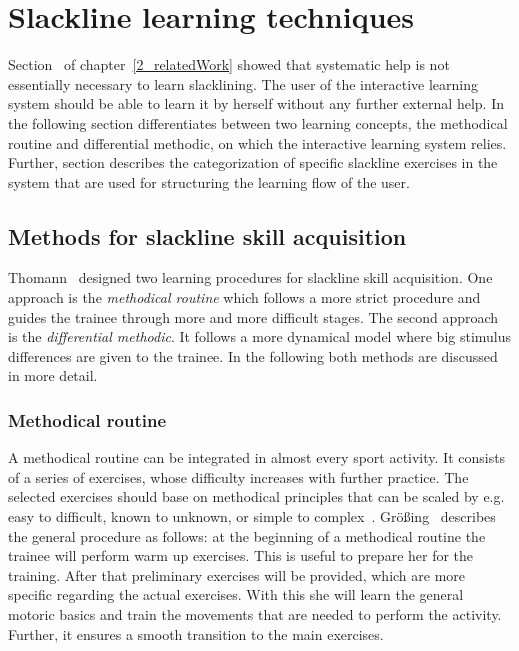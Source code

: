 \section{Slackline learning techniques}\label{3_3_learningTechniques}
Section~\textit{} of chapter~\ref{2_relatedWork} showed that systematic help is not essentially necessary to learn slacklining. The user of the interactive learning system should be able to learn it by herself without any further external help. In the following section \textit{} differentiates between two learning concepts, the methodical routine and differential methodic, on which the interactive learning system relies.
Further, section \textit{} describes the categorization of specific slackline exercises in the system that are used for structuring the learning flow of the user.

\subsection{Methods for slackline skill acquisition}\label{3_3_1_learningConcepts}
Thomann~\cite{Thomann2013-aa} designed two learning procedures for slackline skill acquisition. One approach is the \textit{methodical routine} which follows a more strict procedure and guides the trainee through more and more difficult stages. The second approach is the \textit{differential methodic}. It follows a more dynamical model where big stimulus differences are given to the trainee. In the following both methods are discussed in more detail.

\subsubsection{Methodical routine}
A methodical routine can be integrated in almost every sport activity. It consists of a series of exercises, whose difficulty increases with further practice. The selected exercises should base on methodical principles that can be scaled by e.g. easy to difficult, known to unknown, or simple to complex~\cite{Fetz1996-ml}. Größing~\cite{Groessing1997-sp} describes the general procedure as follows: at the beginning of a methodical routine the trainee will perform warm up exercises. This is useful to prepare her for the training. After that preliminary exercises will be provided, which are more specific regarding the actual exercises. With this she will learn the general motoric basics and train the movements that are needed to perform the activity. Further, it ensures a smooth transition to the main exercises.

